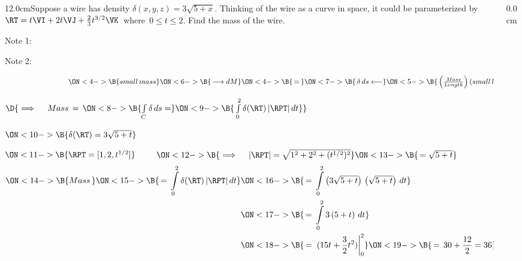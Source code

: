 \begin{frame}
\frametitle{}
\scriptsize
\begin{columns}\begin{column}{12.0cm}\EX Suppose a wire has density $\delta(x,y,z) = 3\sqrt{5+x}$.  Thinking of the wire as a curve in space, it could be parameterized by $\RT = t\VI + 2t\VJ + \frac{2}{3}t^{3/2}\VK$ \,where\, $0 \le t \le 2$. Find the mass of the wire.

Note 1: 


Note 2: 

\vspace{0.2cm}

$\hspace{3.0cm} 
\ON<4->{\B{small \, mass}} 
\ON<6->{\B{\, \longrightarrow dM }}
\ON<4->{\B{\, = \, }}
\ON<7->{\B{\,\delta \, ds \longleftarrow }}
\ON<5->{\B{\, \left(\frac{Mass}{Length}\right) (small \, length)}}$

\vspace{0.2cm}

$\D{\implies \quad Mass \, = \, 
\ON<8->{\B{\int \limits_C \delta \, ds = }}
\ON<9->{\B{\, \int \limits_{0}^{2} \delta(\RT) \, |\RPT|\, dt}}}$

\vspace{0.2cm}
	
	$ 
	\ON<10->{\B{\delta(\RT) = 3\sqrt{5+t}}}$
	
	\vspace{0.2cm}
	
	$ 
	\ON<11->{\B{\RPT = [1,2,t^{1/2}]}}$
	$\qquad   
	\ON<12->{\B{\implies \quad |\RPT| = \sqrt{1^2 + 2^2 + (t^{1/2})^2}}}
	\ON<13->{\B{\, = \sqrt{5 + t}}}$
	\begin{align*}
		\ON<14->{\B{Mass \, }}  
			 \ON<15->{\B{\, = \, \int \limits_{0}^{2} \delta(\RT) \, |\RPT|\, dt}}
			& \ON<16->{\B{\, = \, \int \limits_{0}^{2} \left(3\sqrt{5+t}\right) \, \left(\sqrt{5+t}\right)\, dt}} \\
			& \ON<17->{\B{\, = \, \int \limits_{0}^{2} 3 \left(5+t\right)\, dt}}  \\
			& \ON<18->{\B{\, = \, \left.(15t + \frac{3}{2}t^2) \right|_{0}^{2}}}
			  \ON<19->{\B{\, = \, 30 + \frac{12}{2} = 36}}   \\
	\end{align*}
	

\end{column}\begin{column}{0.0cm}\end{column}\end{columns}
\end{frame}

